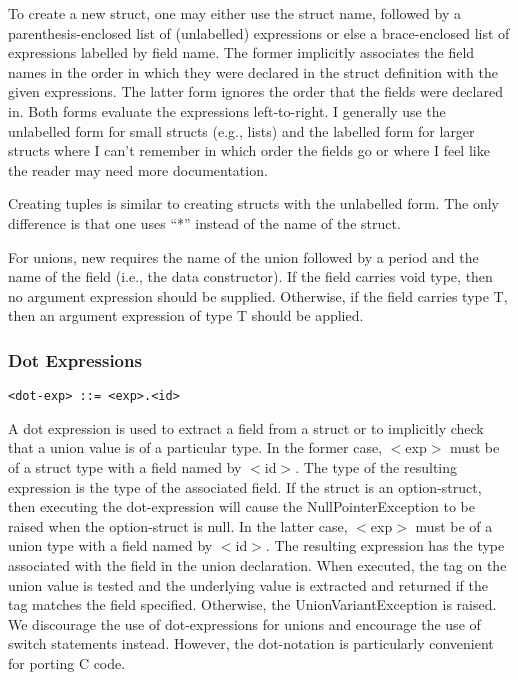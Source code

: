 \documentclass[titlepage,10pt]{article}
\begin{document}
To create a new struct, one may either use the struct name, followed by
a parenthesis-enclosed list of (unlabelled) expressions or else a
brace-enclosed list of expressions labelled by field name.   The former
implicitly associates the field names in the order in which they were
declared in the struct definition with the given expressions.  The
latter form ignores the order that the fields were declared in.  Both
forms evaluate the expressions left-to-right.  I generally use the
unlabelled form for small structs (e.g., lists) and the labelled form
for larger structs where I can't remember in which order the fields go
or where I feel like the reader may need more documentation.

Creating tuples is similar to creating structs with the unlabelled form.
The only difference is that one uses ``*'' instead of the name of the
struct.

For unions, new requires the name of the union followed by a period and
the name of the field (i.e., the data constructor).  If the field
carries void type, then no argument expression should be supplied.
Otherwise, if the field carries type T, then an argument expression of
type T should be applied.

\subsubsection{Dot Expressions}


\begin{verbatim}
<dot-exp> ::= <exp>.<id>
\end{verbatim}

A dot expression is used to extract a field from a struct or to
implicitly check that a union value is of a particular type.  In the
former case, $<$exp$>$ must be of a struct type with a field named by
$<$id$>$.  The type of the resulting expression is the type of the
associated field.  If the struct is an option-struct, then executing the
dot-expression will cause the NullPointerException to be raised when the
option-struct is null.  In the latter case, $<$exp$>$ must be of a union
type with a field named by $<$id$>$.  The resulting expression has the
type associated with the field in the union declaration.  When executed,
the tag on the union value is tested and the underlying value is
extracted and returned if the tag matches the field specified.
Otherwise, the UnionVariantException is raised.  We discourage the use
of dot-expressions for unions and encourage the use of switch statements
instead.   However, the dot-notation is particularly convenient for
porting C code.
\end{document}
